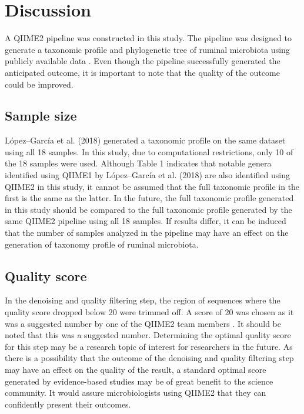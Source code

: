 \documentclass{singlecol-new}
\theoremstyle{TH}{
\newtheorem{lemma}{Lemma}
\newtheorem{theorem}[lemma]{Theorem}
\newtheorem{corrolary}[lemma]{Corrolary}
\newtheorem{conjecture}[lemma]{Conjecture}
\newtheorem{proposition}[lemma]{Proposition}
\newtheorem{claim}[lemma]{Claim}
\newtheorem{stheorem}[lemma]{Wrong Theorem}
\newtheorem{algorithm}{Algorithm}
}
\theoremstyle{THrm}{
\newtheorem{definition}{Definition}[section]
\newtheorem{question}{Question}[section]
\newtheorem{remark}{Remark}
\newtheorem{scheme}{Scheme}
}
\theoremstyle{THhit}{
\newtheorem{case}{Case}[section]
}
\begin{document}
\section{Discussion} 

A QIIME2 pipeline was constructed in this study. The pipeline was designed to generate a taxonomic profile and phylogenetic tree of ruminal microbiota using publicly available data \citep{lopez2018comparison}. Even though the pipeline successfully generated the anticipated outcome, it is important to note that the quality of the outcome could be improved. 

\subsection{Sample size}

L\'opez--Garc\'ia et al. (2018) generated a taxonomic profile on the same dataset using all 18 samples. In this study, due to computational restrictions, only 10 of the 18 samples were used. Although Table 1 indicates that notable genera identified using QIIME1 by L\'opez--Garc\'ia et al. (2018) are also identified using QIIME2 in this study, it cannot be assumed that the full taxonomic profile in the first is the same as the latter. In the future, the full taxonomic profile generated in this study should be compared to the full taxonomic profile generated by the same QIIME2 pipeline using all 18 samples. If results differ, it can be induced that the number of samples analyzed in the pipeline may have an effect on the generation of taxonomy profile of ruminal microbiota. 

\subsection{Quality score}

In the denoising and quality filtering step, the region of sequences where the quality score dropped below 20 were trimmed off. A score of 20 was chosen as it was a suggested number by one of the QIIME2 team members \citep{Trimqs}. It should be noted that this was a suggested number. Determining the optimal quality score for this step may be a research topic of interest for researchers in the future. As there is a possibility that the outcome of the denoising and quality filtering step may have an effect on the quality of the result, a standard optimal score generated by evidence-based studies may be of great benefit to the science community. It would assure microbiologists using QIIME2 that they can confidently present their outcomes.  
\end{document}
